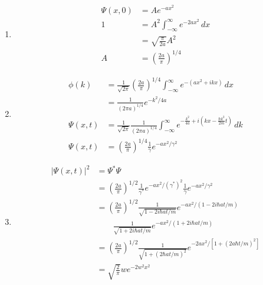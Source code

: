 \documentclass{article}
\begin{document}
\subsection{}

\begin{enumerate}
  \item

        \begin{align*}
          \Psi(x, 0) & = A e^{-a x^2}                                  \\
          1          & = A^2 \int_{-\infty}^\infty  e^{-2 a x^2} \,d x \\
                     & = \sqrt{\frac{\pi}{2 a}} A^2                    \\
          A          & = \left( \frac{2 a}{\pi} \right)^{1 / 4}
        \end{align*}

  \item

        \begin{align*}
          \phi(k)    & = \frac{1}{\sqrt{2 \pi}} \left( \frac{2 a}{\pi} \right)^{1 / 4} \int_{-\infty}^\infty e^{-(a x^2 + i k x)} \,d x                                       \\
                     & = \frac{1}{(2 \pi a)^{1 / 4}} e^{-k^2 / 4 a}                                                                                                           \\
          \Psi(x, t) & = \frac{1}{\sqrt{2 \pi}} \frac{1}{(2 \pi a)^{1 / 4}} \int_{-\infty}^\infty e^{-\frac{k^2}{4 a} + i \left( k x - \frac{\hbar k^2}{2 m} t \right)} \,d k \\
          \Psi(x, t) & = \left( \frac{2 a}{\pi} \right)^{1 / 4} \frac{1}{\gamma} e^{-a x^2 / \gamma^2}
        \end{align*}

  \item

        \begin{align*}
          |\Psi(x, t)|^2 & = \Psi^* \Psi                                                                                                                \\
                         & = \left( \frac{2 a}{\pi} \right)^{1 / 2} \frac{1}{\gamma^*} e^{-a x^2 / (\gamma^*)^2} \frac{1}{\gamma} e^{-a x^2 / \gamma^2} \\
                         & = \left( \frac{2 a}{\pi} \right)^{1 / 2} \frac{1}{\sqrt{1 - 2 i \hbar a t / m}} e^{-a x^2 / (1 - 2 i \hbar a t / m)}         \\
                         & \qquad \frac{1}{\sqrt{1 + 2 i \hbar a t / m}} e^{-a x^2 / (1 + 2 i \hbar a t / m)}                                           \\
                         & = \left( \frac{2 a}{\pi} \right)^{1 / 2} \frac{1}{\sqrt{1 + (2 \hbar a t / m)^2}} e^{-2 a x^2 / [1 + (2 a \hbar t / m)^2]}   \\
                         & = \sqrt{\frac{2}{\pi}} w e^{-2 w^2 x^2}
        \end{align*}


\end{enumerate}
\end{document}
